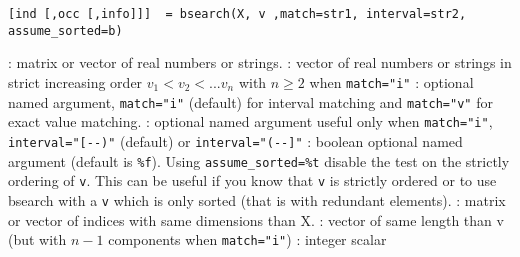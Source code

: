

\begin{mandesc}
\end{mandesc}

\begin{calling_sequence}
\begin{verbatim}
[ind [,occ [,info]]]  = bsearch(X, v ,match=str1, interval=str2, assume_sorted=b)
\end{verbatim}
\end{calling_sequence}
\begin{parameters}
  \begin{varlist}
     :  matrix or vector of real numbers or strings.
     : vector of real numbers or strings in strict
    increasing order  $v_1 <  v_2 < ... v_n$ with $n \ge 2$ 
    when  \verb+match="i"+
     : optional named argument, \verb+match="i"+
                         (default) for interval matching and
                         \verb+match="v"+ for exact value matching.
     : optional named argument useful only
                           when  \verb+match="i"+, \verb+interval="[--)"+
                         (default) or  \verb+interval="(--]"+
     : boolean optional named argument (default
                              is \verb+%f+). Using \verb+assume_sorted=%t+ disable the test
                              on the strictly ordering of
                              \verb+v+. This can be useful if you know
                              that \verb+v+ is strictly ordered or to
                              use bsearch with a \verb+v+ which is
                              only sorted (that is with redundant elements).  
     : matrix or vector of indices with same dimensions than X.
     : vector of same length than v (but with $n-1$ components 
                  when  \verb+match="i"+)
     : integer scalar
  \end{varlist}
\end{parameters}

